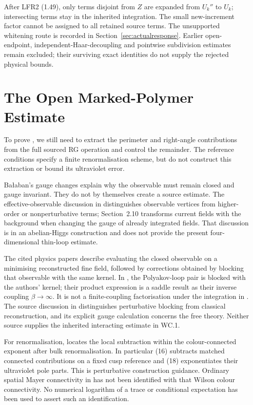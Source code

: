 \documentclass[11pt]{preprint}
\numberwithin{equation}{section}
\begin{document}
After LFR2 (1.49), only terms disjoint from $Z$ are expanded from $U_k''$ to $U_k$; intersecting terms stay in the inherited integration. The small new-increment factor cannot be assigned to all retained source terms. The unsupported whitening route is recorded in Section~\ref{sec:actualresponse}. Earlier open-endpoint, independent-Haar-decoupling and pointwise subdivision estimates remain excluded; their surviving exact identities do not supply the rejected physical bounds.

\section{The Open Marked-Polymer Estimate}
\label{sec:open}

To prove , we still need to extract the perimeter and right-angle contributions from the full sourced RG operation and control the remainder. The reference conditions  specify a finite renormalisation scheme, but do not construct this extraction or bound its ultraviolet error.

Ba{\l}aban's gauge changes explain why the observable must remain closed and gauge invariant. They do not by themselves create a source estimate. The effective-observable discussion in \cite[immediately before Section~2.10]{BIJ} distinguishes observable vertices from higher-order or nonperturbative terms; Section~2.10 transforms current fields with the background when changing the gauge of already integrated fields. That discussion is in an abelian-Higgs construction and does not provide the present four-dimensional thin-loop estimate.

The cited physics papers describe evaluating the closed observable on a minimising reconstructed fine field, followed by corrections obtained by blocking that observable with the same kernel. In \cite[Section~8.1, eqs.~(43)--(46)]{Perfect}, the Polyakov-loop pair is blocked with the authors' kernel; their product expression is a saddle result as their inverse coupling $\beta \to \infty$. It is not a finite-coupling factorisation under the integration in . The source discussion in \cite[Section~5]{Staggered} distinguishes perturbative blocking from classical reconstruction, and its explicit gauge calculation concerns the free theory. Neither source supplies the inherited interacting estimate in WC.1.

For renormalisation, \cite[Section~2.3, eqs.~(13)--(19)]{KR} locates the local subtraction within the colour-connected exponent after bulk renormalisation. In particular (16) subtracts matched connected contributions on a fixed cusp reference and (18) exponentiates their ultraviolet pole parts. This is perturbative construction guidance. Ordinary spatial Mayer connectivity in  has not been identified with that Wilson colour connectivity. No numerical logarithm of a trace or conditional expectation has been used to assert such an identification.
\end{document}
